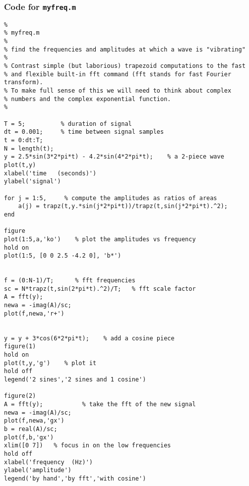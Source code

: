 \documentclass{article}
\begin{document}
\subsubsection* {Code for \tt myfreq.m}


\begin{verbatim}
%
% myfreq.m
%
% find the frequencies and amplitudes at which a wave is "vibrating"
%
% Contrast simple (but laborious) trapezoid computations to the fast
% and flexible built-in fft command (fft stands for fast Fourier transform).
% To make full sense of this we will need to think about complex
% numbers and the complex exponential function.
%

T = 5;			% duration of signal
dt = 0.001;     % time between signal samples
t = 0:dt:T;
N = length(t);
y = 2.5*sin(3*2*pi*t) - 4.2*sin(4*2*pi*t);    % a 2-piece wave
plot(t,y)
xlabel('time   (seconds)')
ylabel('signal')

for j = 1:5,     % compute the amplitudes as ratios of areas
    a(j) = trapz(t,y.*sin(j*2*pi*t))/trapz(t,sin(j*2*pi*t).^2);
end

figure
plot(1:5,a,'ko')    % plot the amplitudes vs frequency
hold on
plot(1:5, [0 0 2.5 -4.2 0], 'b*')


f = (0:N-1)/T;		% fft frequencies
sc = N*trapz(t,sin(2*pi*t).^2)/T;   % fft scale factor
A = fft(y);
newa = -imag(A)/sc;
plot(f,newa,'r+')


y = y + 3*cos(6*2*pi*t);    % add a cosine piece
figure(1)
hold on
plot(t,y,'g')    % plot it
hold off
legend('2 sines','2 sines and 1 cosine')

figure(2)
A = fft(y);           % take the fft of the new signal
newa = -imag(A)/sc;
plot(f,newa,'gx')
b = real(A)/sc;
plot(f,b,'gx')
xlim([0 7])   % focus in on the low frequencies
hold off
xlabel('frequency  (Hz)')
ylabel('amplitude')
legend('by hand','by fft','with cosine')
\end{verbatim}
\end{document}
